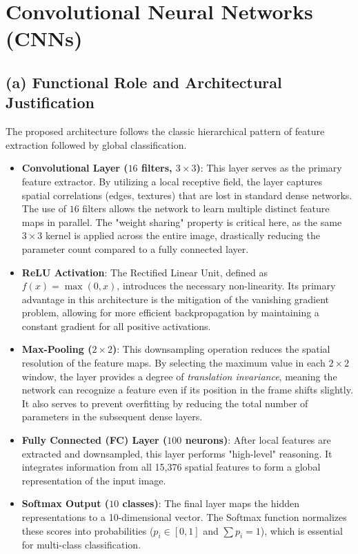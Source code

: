 \clearpage
\section{Convolutional Neural Networks (CNNs)}
\subsection*{(a) Functional Role and Architectural Justification}
The proposed architecture follows the classic hierarchical pattern of feature
extraction followed by global classification.
\begin{itemize}
 \item \textbf{Convolutional Layer ($16$ filters, $3 \times 3$)}: This layer serves as
the primary feature extractor. By utilizing a local receptive field, the layer captures
spatial correlations (edges, textures) that are lost in standard dense networks. The
use of $16$ filters allows the network to learn multiple distinct feature maps in
parallel. The "weight sharing" property is critical here, as the same $3 \times 3$
kernel is applied across the entire image, drastically reducing the parameter count
compared to a fully connected layer.
 \item \textbf{ReLU Activation}: The Rectified Linear Unit, defined as $f(x) = \max(0,
x)$, introduces the necessary non-linearity. Its primary advantage in this architecture
is the mitigation of the vanishing gradient problem, allowing for more efficient
backpropagation by maintaining a constant gradient for all positive activations.
 \item \textbf{Max-Pooling ($2 \times 2$)}: This downsampling operation reduces
the spatial resolution of the feature maps. By selecting the maximum value in each
$2 \times 2$ window, the layer provides a degree of \textit{translation invariance},
meaning the network can recognize a feature even if its position in the frame shifts
slightly. It also serves to prevent overfitting by reducing the total number of
parameters in the subsequent dense layers.
 \item \textbf{Fully Connected (FC) Layer ($100$ neurons)}: After local features are
extracted and downsampled, this layer performs "high-level" reasoning. It integrates
information from all 15,376 spatial features to form a global representation of the
input image.
 \item \textbf{Softmax Output ($10$ classes)}: The final layer maps the hidden
representations to a 10-dimensional vector. The Softmax function normalizes these
scores into probabilities ($p_i \in [0, 1]$ and $\sum p_i = 1$), which is essential for
multi-class classification.
\end{itemize}
